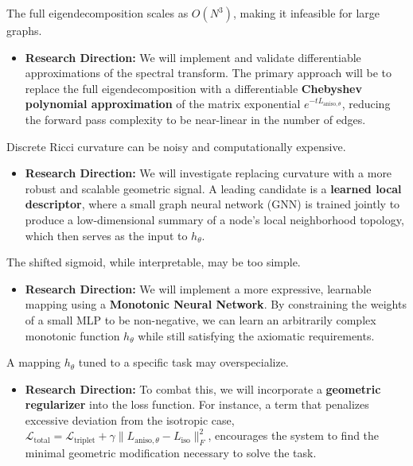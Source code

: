 \documentclass[11pt, letterpaper]{article}
\begin{document}
\begin{description}[style=unboxed, leftmargin=0pt]
    \item[Computational Scalability] The full eigendecomposition scales as $O(N^3)$, making it infeasible for large graphs.
    \begin{itemize}
        \item \textbf{Research Direction:} We will implement and validate differentiable approximations of the spectral transform. The primary approach will be to replace the full eigendecomposition with a differentiable \textbf{Chebyshev polynomial approximation} of the matrix exponential $e^{-tL_{\text{aniso}, \theta}}$, reducing the forward pass complexity to be near-linear in the number of edges.
    \end{itemize}

    \item[Fidelity of the Geometric Signal] Discrete Ricci curvature can be noisy and computationally expensive.
    \begin{itemize}
        \item \textbf{Research Direction:} We will investigate replacing curvature with a more robust and scalable geometric signal. A leading candidate is a \textbf{learned local descriptor}, where a small graph neural network (GNN) is trained jointly to produce a low-dimensional summary of a node's local neighborhood topology, which then serves as the input to $h_\theta$.
    \end{itemize}

    \item[Expressivity of the Mapping] The shifted sigmoid, while interpretable, may be too simple.
    \begin{itemize}
        \item \textbf{Research Direction:} We will implement a more expressive, learnable mapping using a \textbf{Monotonic Neural Network}. By constraining the weights of a small MLP to be non-negative, we can learn an arbitrarily complex monotonic function $h_\theta$ while still satisfying the axiomatic requirements.
    \end{itemize}

    \item[Generalization and Overfitting] A mapping $h_\theta$ tuned to a specific task may overspecialize.
    \begin{itemize}
        \item \textbf{Research Direction:} To combat this, we will incorporate a \textbf{geometric regularizer} into the loss function. For instance, a term that penalizes excessive deviation from the isotropic case, $\mathcal{L}_{\text{total}} = \mathcal{L}_{\text{triplet}} + \gamma \|L_{\text{aniso}, \theta} - L_{\text{iso}}\|_F^2$, encourages the system to find the minimal geometric modification necessary to solve the task.
    \end{itemize}


\end{description}
\end{document}
